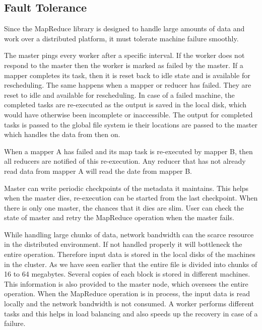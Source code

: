 \documentclass[sigconf]{acmart}
\begin{document}
\subsection{Fault Tolerance}
\par Since the MapReduce library is designed to handle large amounts of data and work over a distributed platform, it must tolerate machine failure smoothly. 

\par The master pings every worker after a specific interval. If the worker does not respond to the master then the worker is marked as failed by the master. If a mapper completes its task, then it is reset back to idle state and is available for rescheduling. The same happens when a mapper or reducer has failed. They are reset to idle and available for rescheduling. In case of a failed machine, the completed tasks are re-executed as the output is saved in the local disk, which would have otherwise been incomplete or inaccessible. The output for completed tasks is passed to the global file system ie their locations are passed to the master which handles the data from then on.  
\par When a mapper A has failed and its map task is re-executed by mapper B, then all reducers are notified of this re-execution. Any reducer that has not already read data from mapper A will read the date from mapper B. 
\par Master can write periodic checkpoints of the metadata it maintains. This helps when the master dies, re-execution can be started from the last checkpoint. When there is only one master, the chances that it dies are slim. User can check the state of master and retry the MapReduce operation when the master fails.
\par While handling large chunks of data, network bandwidth can the scarce resource in the distributed environment. If not handled properly it will bottleneck the entire operation. Therefore input data is stored in the local disks of the machines in the cluster. As we have seen earlier that the entire file is divided into chunks of 16 to 64 megabytes. Several copies of each block is stored in different machines. This information is also provided to the master node, which oversees the entire operation. When the MapReduce operation is in process, the input data is read locally and the network bandwidth is not consumed. A worker performs different tasks and this helps in load balancing and also speeds up the recovery in case of a failure.  
\end{document}

